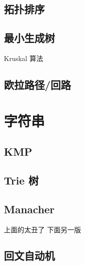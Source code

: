 \documentclass{article}
\begin{document}
\subsection{拓扑排序}



\subsection{最小生成树}

Kruskal 算法



\subsection{欧拉路径/回路}



\section{字符串}

\subsection{KMP}



\subsection{Trie 树}



\subsection{Manacher}



上面的太丑了 下面另一版



\subsection{回文自动机}


\end{document}
